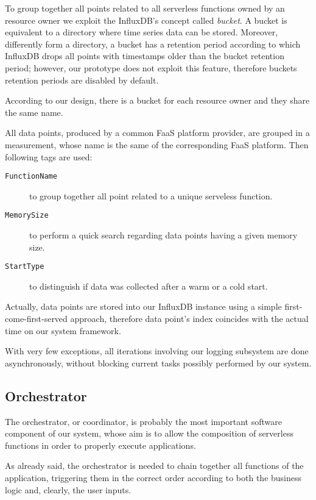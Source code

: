 \documentclass[12pt,a4paper]{report}
\begin{document}
To group together all points related to all serverless functions owned by an resource owner we exploit the InfluxDB's concept called \textit{bucket}. A bucket is equivalent to a directory where time series data can be stored. Moreover, differently form a directory, a bucket has a retention period according to which InfluxDB drops all points with timestamps older than the bucket retention period; however, our prototype does not exploit this feature, therefore buckets retention periods are disabled by default.

According to our design, there is a bucket for each resource owner and they share the same name.

All data points, produced by a common FaaS platform provider, are grouped in a measurement, whose name is the same of the corresponding FaaS platform. Then following tags are used: 

\begin{description}
	\item[\texttt{FunctionName}] to group together all point related to a unique serveless function. 
	\item[\texttt{MemorySize}] to perform a quick search regarding data points having a given memory size.
	\item[\texttt{StartType}] to distinguish if data was collected after a warm or a cold start.
\end{description}

Actually, data points are stored into our InfluxDB instance using a simple first-come-first-served approach, therefore data point's index coincides with the actual time on our system framework. 

With very few exceptions, all iterations involving our logging subsystem are done asynchronously, without blocking current tasks possibly performed by our system.  

\subsection{Orchestrator}
	
The orchestrator, or coordinator, is probably the most important software component of our system, whose aim is to allow the composition of serverless functions in order to properly execute applications.

As already said, the orchestrator is needed to chain together all functions of the application, triggering them in the correct order according to both the business logic and, clearly, the user inputs.
\end{document}
